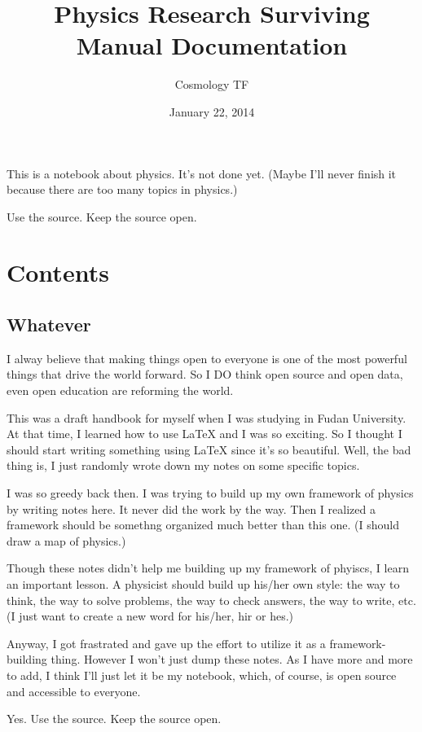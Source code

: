 \documentclass[letterpaper,10pt,english]{sphinxmanual}
\title{Physics Research Surviving Manual Documentation}
\date{January 22, 2014}
\author{Cosmology TF}
\begin{document}
\maketitle
\tableofcontents
{}\label{index::doc}


This is a notebook about physics. It's not done yet. (Maybe I'll never finish it because there are too many topics in physics.)

Use the source. Keep the source open.


\chapter{Contents}
\label{index:welcome-to-physics-research-survival-manual}\label{index:contents}

\section{Whatever}
\label{preface::doc}\label{preface:whatever}
I alway believe that making things open to everyone is one of the most powerful things that drive the world forward. So I DO think open source and open data, even open education are reforming the world.

This was a draft handbook for myself when I was studying in Fudan University. At that time, I learned how to use LaTeX and I was so exciting. So I thought I should start writing something using LaTeX since it's so beautiful. Well, the bad thing is, I just randomly wrote down my notes on some specific topics.

I was so greedy back then. I was trying to build up my own framework of physics by writing notes here. It never did the work by the way. Then I realized a framework should be somethng organized much better than this one. (I should draw a map of physics.)

Though these notes didn't help me building up my framework of phyiscs, I learn an important lesson. A physicist should build up his/her own style: the way to think, the way to solve problems, the way to check answers, the way to write, etc.  (I just want to create a new word for his/her, hir or hes.)

Anyway, I got frastrated and gave up the effort to utilize it as a framework-building thing. However I won't just dump these notes. As I have more and more to add, I think I'll just let it be my notebook, which, of course, is open source and accessible to everyone.

Yes. Use the source. Keep the source open.
\end{document}

